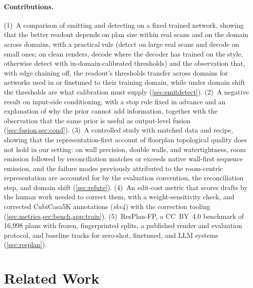 \documentclass{article}
\begin{document}
\paragraph{Contributions.}
(1)~A comparison of emitting and detecting on a fixed trained network, showing
that the better readout depends on plan size within real scans and on the
domain across domains, with a practical rule (detect on large real scans and decode on small ones;
on clean renders, decode where the decoder has trained on the style,
otherwise detect with in-domain-calibrated thresholds) and the observation
that, with edge chaining off, the readout's thresholds transfer across
domains for networks used in or finetuned to their training domain, while
under domain shift the thresholds are what calibration must supply
(\cref{sec:emitdetect}). (2)~A negative result on input-side
conditioning, with a stop rule fixed in advance and an explanation of why the
prior cannot add information, together with the observation that the same
prior is useful as output-level fusion (\cref{sec:fusion,sec:cond}). (3)~A
controlled study with matched data and recipe, showing that the
representation-first account of floorplan topological quality does not hold in
our setting: on wall precision, double walls, and watertightness, room emission
followed by reconciliation matches or exceeds native wall-first sequence
emission, and the failure modes previously attributed to the room-centric
representation are accounted for by the evaluation convention, the
reconciliation step, and domain shift (\cref{sec:refute}). (4)~An edit-cost
metric that scores drafts by the human work needed to correct them, with a
weight-sensitivity check, and corrected CubiCasa5K annotations (\emph{skv4})
with the correction tooling (\cref{sec:metrics,sec:bench,app:train}).
(5)~ResPlan-FP, a CC~BY~4.0 benchmark of 16{,}998 plans with frozen,
fingerprinted splits, a published render and evaluation protocol, and baseline
tracks for zero-shot, finetuned, and LLM systems (\cref{sec:resplan}).

\section{Related Work}
\end{document}
